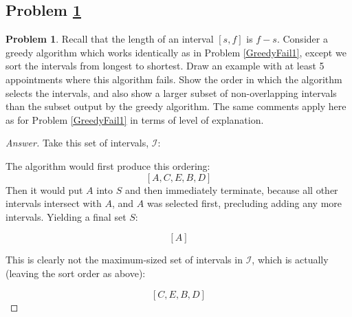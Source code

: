 \documentclass[11pt]{article}
\theoremstyle{definition}
\theoremstyle{definition}
\newtheorem{required}{Problem}
\theoremstyle{definition}
\newcommand{\interval}[4]{\draw (#2, #1) -- (#3, #1); %
\draw (#2, #1-0.11) -- (#2, #1+0.11); %
\draw (#3, #1-0.11) -- (#3, #1+0.11); %
\node[] at (#2-0.6, #1) {#4};
}
\begin{document}
\newpage
\subsection{Problem \ref{GreedyFail2}}
\begin{required} \label{GreedyFail2}
Recall that the length of an interval $[s, f]$ is $f - s$. Consider a greedy algorithm which works identically as in Problem \ref{GreedyFail1}, except we sort the intervals from longest to shortest. Draw an example with at least 5 appointments where this algorithm fails. Show the order in which the algorithm selects the intervals, and also show a larger subset of non-overlapping intervals than the subset output by the greedy algorithm. The same comments apply here as for Problem \ref{GreedyFail1} in terms of level of explanation.
\end{required}

\begin{proof}[Answer]

Take this set of intervals, $\mathcal{I}$:


The algorithm would first produce this ordering:
\[
	[A, C, E, B, D]
\]
Then it would put $A$ into $S$ and then immediately terminate, because all other intervals intersect with $A$,
and $A$ was selected first, precluding adding any more intervals. Yielding a final set $S$:

\[ 
	[A]
\] 

This is clearly not the maximum-sized set of intervals in $\mathcal{I}$, which is actually (leaving the sort order as above):

\[
	[C, E, B, D]	
\]

\end{proof}

\newpage
\end{document}
